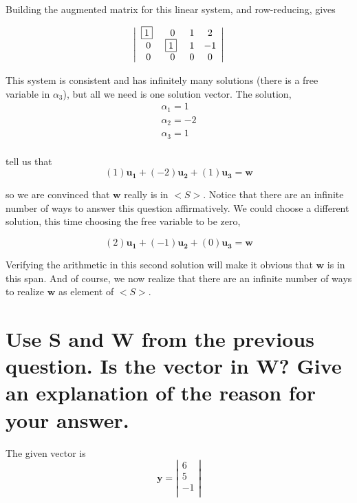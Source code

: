 \documentclass{article}
\begin{document}
Building the augmented matrix for this linear system, and row-reducing, gives

\begin{equation}
 \left| \begin{array}{cccc}
  $\boxed{1}$~ & 0 & 1 & 2 \\
  0 & $\boxed{1}$~ & 1 & -1 \\
  0 & 0 & 0 & 0
  \end{array} \right|
\end{equation}

This system is consistent and has infinitely many solutions (there is a free variable in \(\alpha_3\)), but all we need is one solution vector. The solution,
\begin{equation}
  \begin{array}{c}
    \alpha_1 = 1 \\
    \alpha_2 = -2 \\
    \alpha_3 = 1 \\
  \end{array}
\end{equation}

tell us that
\begin{equation}
  (1)\bm{u_1} + (-2)\bm{u_2} + (1)\bm{u_3} = \bm{w}
\end{equation}

so we are convinced that \(\bm{w}\) really is in \(<S>\). Notice that there are an infinite number of ways to answer this question affirmatively. We could choose a different solution, this time choosing the free variable to be zero,

\begin{equation}
  (2)\bm{u_1} + (-1)\bm{u_2} + (0)\bm{u_3} = \bm{w}
\end{equation}

Verifying the arithmetic in this second solution will make it obvious that \(\bm{w}\) is in this span. And of course, we now realize that there are an infinite number of ways to realize \(\bm{w}\) as element of \(<S>\).

\section{Use S and W from the previous question. Is the vector
in \(\bm{W}\)? Give an explanation of the reason for your answer.}
The given vector is
\[
\bm{y}=
\left|
\begin{array}{c}
  6 \\ 5 \\ -1 \\
\end{array}
\right|
\]
\end{document}
